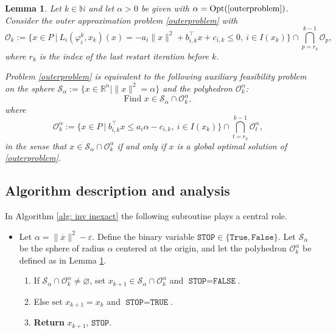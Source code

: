 \documentclass[12pt]{amsart}
\theoremstyle{plain}
\newtheorem{lemma}[theorem]{Lemma}
\theoremstyle{definition}
\begin{document}
\begin{lemma} \cite[Lemma 12]{bednarczuk2026outer}
\label{lem: from out to feas}
Let \(k \in \mathbb{N}\) and let \(\alpha > 0\) be given with \(\alpha = \operatorname{Opt}(\eqref{outerproblem})\). Consider the outer approximation problem \eqref{outerproblem} with
\[
\mathcal{O}_k := \bigl\{ x \in P \ \big|\ 
L_i(\varphi_i^k, x_k)(x) = -a_i \|x\|^2 + b_{i,k}^\top x + c_{i,k} \le 0,\ 
i \in I(x_k) \bigr\} \cap \bigcap_{p=r_k}^{k-1} \mathcal{O}_p,
\]
where \(r_k\) is the index of the last restart iteration before \(k\).

Problem \eqref{outerproblem} is equivalent to the following auxiliary feasibility problem on the sphere \(\mathcal{S}_\alpha := \{ x \in \mathbb{R}^n \mid \|x\|^2 = \alpha \}\) and the polyhedron \(\mathcal{O}_k^\alpha\):
\begin{equation}
\label{Feasibility_prob}
\text{Find } x \in \mathcal{S}_\alpha \cap \mathcal{O}_k^\alpha,
\end{equation}
where
\[
\mathcal{O}_k^\alpha := \bigl\{ x \in P \ \big|\ 
b_{i,k}^\top x \le a_i \alpha - c_{i,k},\ 
i \in I(x_k) \bigr\} \cap \bigcap_{t=r_k}^{k-1} \mathcal{O}_t^\alpha,
\]
in the sense that \(x \in \mathcal{S}_\alpha \cap \mathcal{O}_k^\alpha\) if and only if \(x\) is a global optimal solution of \eqref{outerproblem}.
\end{lemma}

\subsection{Algorithm description and analysis}

In Algorithm \ref{alg: inv inexact} the following subroutine plays a central role.

\makeatletter
\renewcommand*{\ALG@name}{Subroutine}
\makeatother
\setcounter{algorithm}{0}

\begin{algorithm}[H]
\caption{Outer problem solver for given \(\varepsilon > 0\)}
\label{alg: outsolver}
\begin{itemize}
    \item Let \(\alpha = \|\overline{x}\|^2 - \varepsilon\). Define the binary variable \(\texttt{STOP} \in \{\texttt{True}, \texttt{False}\}\). Let \(\mathcal{S}_\alpha\) be the sphere of radius \(\alpha\) centered at the origin, and let the polyhedron \(\mathcal{O}_k^\alpha\) be defined as in Lemma \ref{lem: from out to feas}.
    
    \begin{enumerate}[label=\arabic*:]
        \item If \(\mathcal{S}_\alpha \cap \mathcal{O}_k^\alpha \neq \varnothing\), set \(x_{k+1} \in \mathcal{S}_\alpha \cap \mathcal{O}_k^\alpha\) and \(\texttt{STOP} = \texttt{FALSE}\).
        \item Else set \(x_{k+1} = x_k\) and \(\texttt{STOP} = \texttt{TRUE}\).
        \item \textbf{Return} \(x_{k+1}\), \(\texttt{STOP}\).
    \end{enumerate}
\end{itemize}
\end{algorithm}
\end{document}
